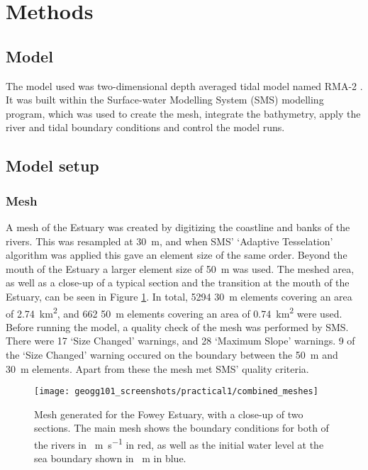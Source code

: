 \documentclass{article}
\begin{document}
\section{Methods}

\subsection{Model}

The model used was two-dimensional depth averaged tidal model named RMA-2 \parencite{king1990program}. It was built within the Surface-water Modelling System (SMS) modelling program, which was used to create the mesh, integrate the bathymetry, apply the river and tidal boundary conditions and control the model runs.

\subsection{Model setup}

\subsubsection{Mesh}
A mesh of the Estuary was created by digitizing the coastline and banks of the rivers. This was resampled at \SI{30}{m}, and when SMS' `Adaptive Tesselation' algorithm was applied this gave an element size of the same order. Beyond the mouth of the Estuary a larger element size of \SI{50}{m} was used. The meshed area, as well as a close-up of a typical section and the transition at the mouth of the Estuary, can be seen in Figure \ref{fig:combined_meshes}. In total, 5294 \SI{30}{m} elements covering an area of \SI{2.74}{km^{2}}, and 662 \SI{50}{m} elements covering an area of \SI{0.74}{km^{2}} were used. Before running the model, a quality check of the mesh was performed by SMS. There were 17 `Size Changed' warnings, and 28 `Maximum Slope' warnings. 9 of the `Size Changed' warning occured on the boundary between the \SI{50}{m} and \SI{30}{m} elements. Apart from these the mesh met SMS' quality criteria.


\begin{figure}[hbp]
    \centering
    \texttt{[image: geogg101\_screenshots/practical1/combined\_meshes]}
    \caption{Mesh generated for the Fowey Estuary, with a close-up of two sections. The main mesh shows the boundary conditions for both of the rivers in \SI{}{m.s^{-1}} in red, as well as the initial water level at the sea boundary shown in \SI{}{m} in blue.}
    \label{fig:combined_meshes}
\end{figure}
\end{document}
